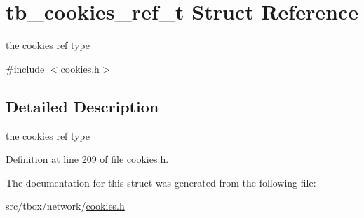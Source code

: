 \hypertarget{structtb__cookies__ref__t}{\section{tb\-\_\-cookies\-\_\-ref\-\_\-t Struct Reference}
\label{structtb__cookies__ref__t}
}


the cookies ref type  




{\ttfamily \#include $<$cookies.\-h$>$}



\subsection{Detailed Description}
the cookies ref type 

Definition at line 209 of file cookies.\-h.



The documentation for this struct was generated from the following file\-:\begin{DoxyCompactItemize}
\item 
src/tbox/network/\hyperlink{cookies_8h}{cookies.\-h}\end{DoxyCompactItemize}
